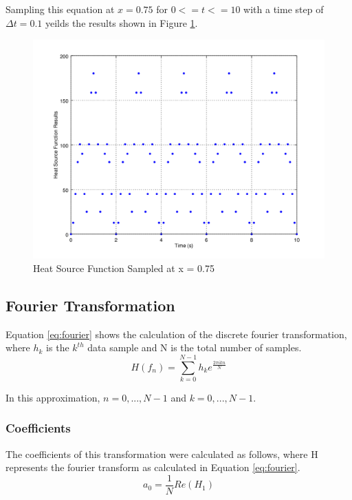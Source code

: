 \documentclass[12pt]{amsart}
\begin{document}
Sampling this equation at $x = 0.75$ for $0<=t<=10$ with a time step of $\Delta t = 0.1$ yeilds the results shown in Figure \ref{fig:task8fig1}.

\begin{center}
\begin{figure}
\includegraphics[scale=0.7]{task8fig1}
\caption{Heat Source Function Sampled at x = 0.75}
\label{fig:task8fig1}
\end{figure}
\end{center}


\subsection{Fourier Transformation}
Equation \ref{eq:fourier} shows the calculation of the discrete fourier transformation, where $h_k$ is the $k^{th}$ data sample and N is the total number of samples.
\begin{equation}
H(f_n) = \sum_{k=0}^{N-1} h_k e^\frac{2 \pi i k n}{N}
\label{eq:fourier}
\end{equation}

In this approximation, $n=0,...,N-1$ and $k=0,...,N-1$. \\
\subsubsection{Coefficients}
The coefficients of this transformation were calculated as follows, where H represents the fourier transform as calculated in Equation \ref{eq:fourier}. 
 \begin{equation}
 a_0 = \frac{1}{N} Re(H_1)
 \label{eq:a0}
 \end{equation}
 
\end{document}
